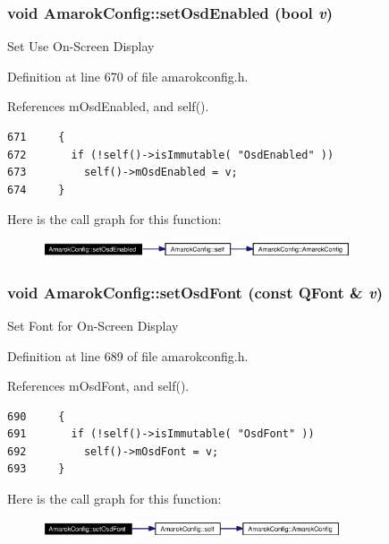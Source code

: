 \subsubsection{\setlength{\rightskip}{0pt plus 5cm}void Amarok\-Config::set\-Osd\-Enabled (bool {\em v})\hspace{0.3cm}{\tt  [inline, static]}}\label{classAmarokConfig_AmarokConfige69}


Set Use On-Screen Display 

Definition at line 670 of file amarokconfig.h.

References m\-Osd\-Enabled, and self().



\footnotesize\begin{verbatim}671     {
672       if (!self()->isImmutable( "OsdEnabled" ))
673         self()->mOsdEnabled = v;
674     }
\end{verbatim}\normalsize 


Here is the call graph for this function:\begin{figure}[H]
\begin{center}
\leavevmode
\includegraphics[width=258pt]{classAmarokConfig_AmarokConfige69_cgraph}
\end{center}
\end{figure}
\subsubsection{\setlength{\rightskip}{0pt plus 5cm}void Amarok\-Config::set\-Osd\-Font (const QFont \& {\em v})\hspace{0.3cm}{\tt  [inline, static]}}\label{classAmarokConfig_AmarokConfige71}


Set Font for On-Screen Display 

Definition at line 689 of file amarokconfig.h.

References m\-Osd\-Font, and self().



\footnotesize\begin{verbatim}690     {
691       if (!self()->isImmutable( "OsdFont" ))
692         self()->mOsdFont = v;
693     }
\end{verbatim}\normalsize 


Here is the call graph for this function:\begin{figure}[H]
\begin{center}
\leavevmode
\includegraphics[width=250pt]{classAmarokConfig_AmarokConfige71_cgraph}
\end{center}
\end{figure}
